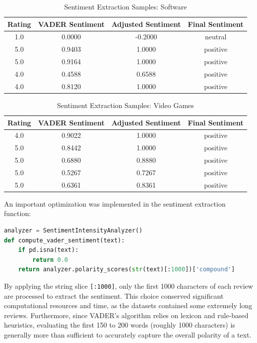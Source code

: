 \documentclass[a4paper, 12pt]{article}
\begin{document}
\begin{table}[H]
    \centering
    \caption{Sentiment Extraction Samples: Software}
    \begin{tabular}{cccc}
        \hline
        \textbf{Rating} & \textbf{VADER Sentiment} & \textbf{Adjusted Sentiment} & \textbf{Final Sentiment} \\
        \hline
        1.0 &  0.0000 & -0.2000 & neutral \\
        5.0 &  0.9403 &  1.0000 & positive \\
        5.0 &  0.9164 &  1.0000 & positive \\
        4.0 &  0.4588 &  0.6588 & positive \\
        4.0 &  0.8120 &  1.0000 & positive \\
        \hline
    \end{tabular}
\end{table}

\begin{table}[H]
    \centering
    \caption{Sentiment Extraction Samples: Video Games}
    \begin{tabular}{cccc}
        \hline
        \textbf{Rating} & \textbf{VADER Sentiment} & \textbf{Adjusted Sentiment} & \textbf{Final Sentiment} \\
        \hline
        4.0 &  0.9022 &  1.0000 & positive \\
        5.0 &  0.8442 &  1.0000 & positive \\
        5.0 &  0.6880 &  0.8880 & positive \\
        5.0 &  0.5267 &  0.7267 & positive \\
        5.0 &  0.6361 &  0.8361 & positive \\
        \hline
    \end{tabular}
\end{table}
\newpage
An important optimization was implemented in the sentiment extraction function:
\begin{lstlisting}[language=Python]
analyzer = SentimentIntensityAnalyzer()
def compute_vader_sentiment(text):
    if pd.isna(text):
        return 0.0
    return analyzer.polarity_scores(str(text)[:1000])['compound']
\end{lstlisting}
By applying the string slice \texttt{[:1000]}, only the first 1000 characters of each review are processed to extract the sentiment. This choice conserved significant computational resources and time, as the datasets contained some extremely long reviews. Furthermore, since VADER's algorithm relies on lexicon and rule-based heuristics, evaluating the first 150 to 200 words (roughly 1000 characters) is generally more than sufficient to accurately capture the overall polarity of a text.
\end{document}
